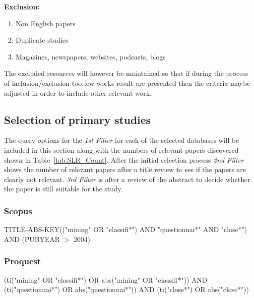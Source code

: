 \noindent
\textbf{Exclusion:}
\begin{enumerate}
  \item Non English papers
  \item Duplicate studies
  \item Magazines, newspapers, websites, podcasts, blogs
\end{enumerate}

\noindent
The excluded resources will however be maintained so that if during the process of inclusion/exclusion too few works result are presented then the criteria maybe adjusted in order to include other relevant work.

\subsection{Selection of primary studies}

The query options for the \textit{1st Filter} for each of the selected databases will be included in this section along with the numbers of relevant papers discovered shown in Table~\ref{tab:SLR_Count}.
After the initial selection process \textit{2nd Filter} shows the number of relevant papers after a title review to see if the papers are clearly not relevant. \textit{3rd Filter} is after a review of the abstract to decide whether the paper is still suitable for the study.



\subsubsection{Scopus}
\noindent
TITLE-ABS-KEY(("mining" OR "classifi*") AND "questionnai*" AND "close*") AND (PUBYEAR $>$ 2004)

\subsubsection{Proquest}
\noindent
(ti("mining" OR "classifi*") OR abs("mining" OR "classifi*")) AND (ti("questionnai*") OR abs("questionnai*")) AND (ti("close*") OR abs("close*"))

